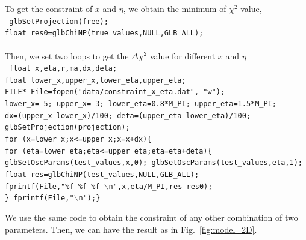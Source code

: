 \documentclass[a4paper,11pt]{article}
\begin{document}
To get the constraint of $x$ and $\eta$, we obtain the minimum of $\chi^2$ value,\vspace{0.2cm}\\
\texttt{
    glbSetProjection(free);\\
    float res0=glbChiNP(true\_values,NULL,GLB\_ALL);\\ } \vspace{0.2cm}\\
%
Then, we set two loops to get the $\Delta \chi^2$ value for different $x$ and $\eta$\vspace{0.2cm}\\
%
\texttt{     float x,eta,r,ma,dx,deta;\\
     float lower\_x,upper\_x,lower\_eta,upper\_eta;\\
     FILE* File=fopen("data/constraint\_x\_eta.dat", "w");\\
    lower\_x=-5; upper\_x=-3; lower\_eta=0.8*M\_PI; upper\_eta=1.5*M\_PI;\\
    dx=(upper\_x-lower\_x)/100; deta=(upper\_eta-lower\_eta)/100;\\
        glbSetProjection(projection);\\
   for (x=lower\_x;x<=upper\_x;x=x+dx)\{ \\
    for (eta=lower\_eta;eta<=upper\_eta;eta=eta+deta)\{\\
     glbSetOscParams(test\_values,x,0); glbSetOscParams(test\_values,eta,1);\\
        float res=glbChiNP(test\_values,NULL,GLB\_ALL);\\
            fprintf(File,"\%f \%f  \%f $\backslash$n",x,eta/M\_PI,res-res0);\\
                     \} fprintf(File,"$\backslash$n");\}\\
}

We use the same code to obtain the constraint of any other combination of two parameters. Then, we can have the result as in Fig.~\ref{fig:model_2D}.


\end{document}
